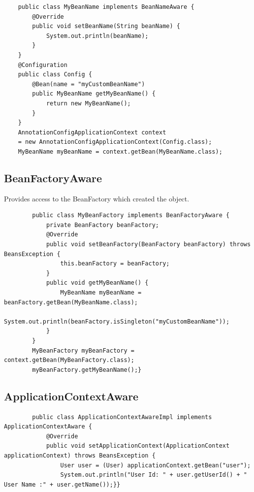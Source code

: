 \documentclass{scrartcl}
\begin{document}
\begin{lstlisting}
    public class MyBeanName implements BeanNameAware {
        @Override
        public void setBeanName(String beanName) {
            System.out.println(beanName);
        }
    }
    @Configuration
    public class Config {
        @Bean(name = "myCustomBeanName")
        public MyBeanName getMyBeanName() {
            return new MyBeanName();
        }
    }
    AnnotationConfigApplicationContext context
    = new AnnotationConfigApplicationContext(Config.class);
    MyBeanName myBeanName = context.getBean(MyBeanName.class);

\end{lstlisting}

\subsection{BeanFactoryAware}

    Provides access to the BeanFactory which created the object.

    \begin{lstlisting}
        public class MyBeanFactory implements BeanFactoryAware {
            private BeanFactory beanFactory;
            @Override
            public void setBeanFactory(BeanFactory beanFactory) throws BeansException {
                this.beanFactory = beanFactory;
            }
            public void getMyBeanName() {
                MyBeanName myBeanName = beanFactory.getBean(MyBeanName.class);
                System.out.println(beanFactory.isSingleton("myCustomBeanName"));
            }
        }
        MyBeanFactory myBeanFactory = context.getBean(MyBeanFactory.class);
        myBeanFactory.getMyBeanName();}
    \end{lstlisting}

\subsection{ApplicationContextAware}
    \begin{lstlisting}
        public class ApplicationContextAwareImpl implements ApplicationContextAware {
            @Override
            public void setApplicationContext(ApplicationContext applicationContext) throws BeansException {
                User user = (User) applicationContext.getBean("user");
                System.out.println("User Id: " + user.getUserId() + " User Name :" + user.getName());}}
    \end{lstlisting}
\end{document}
